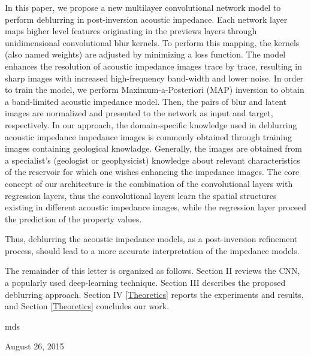 \documentclass[journal]{IEEEtran}
\begin{document}
In this paper, we propose a new multilayer convolutional network model to perform deblurring in post-inversion acoustic impedance.
Each network layer maps higher level features originating in the previews layers through unidimensional convolutional blur kernels.
To perform this mapping, the kernels (also named weights) are adjusted by minimizing a loss function. 
The model enhances the resolution of acoustic impedance images trace by trace, resulting in sharp images with
increased high-frequency band-width and lower noise.
In order to train the model, we perform Maximum-a-Posteriori (MAP) inversion to obtain a band-limited acoustic impedance model.
Then, the pairs of blur and latent images are normalized and 
presented to the network as input and target, respectively.
In our approach, the domain-specific knowledge used in deblurring acoustic impedance impedance images is commonly
obtained through training images containing geological knowladge. Generally, the images are obtained from a specialist's
(geologist or geophysicist) knowledge about relevant characteristics of the reservoir for which one wishes enhancing the impedance images.
The core concept of our architecture is the combination of the convolutional layers with regression layers, thus the convolutional layers learn the spatial structures existing in different acoustic impedance images, while the regression layer proceed the prediction of the property values.

Thus, deblurring the acoustic impedance models, as a post-inversion refinement process, should lead to a more accurate
interpretation of the impedance models.

The remainder of this letter is organized as follows. Section II
reviews the CNN, a popularly used deep-learning technique.
Section III describes the proposed deblurring approach.
Section IV \ref{Theoretics} reports the experiments and results, and Section \ref{Theoretics}
concludes our work.

\hfill mds
 
\hfill August 26, 2015


\end{document}
